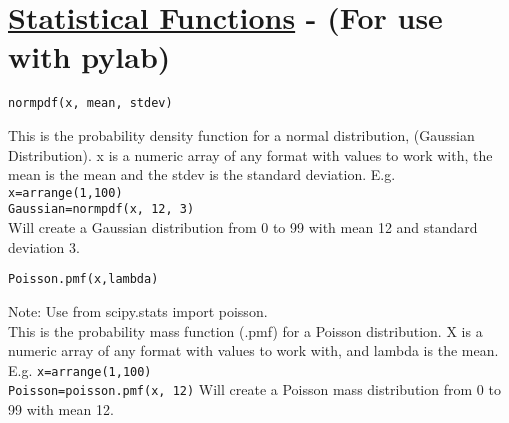 \section*{\underline{Statistical Functions}  - ({\color{red}For use with pylab})}

\noindent \texttt{normpdf(x, mean, stdev)}
\begin{myindentpar}{1.4cm}
\vspace*{-1ex}
This is the probability density function for a normal distribution, (Gaussian Distribution). x is a numeric array of any format with values to work with, the mean is the mean and the stdev is the standard deviation.
E.g. \texttt{x=arrange(1,100)\\
Gaussian=normpdf(x, 12, 3)}\\
Will create a Gaussian distribution from 0 to 99 with mean 12 and standard deviation 3.
\end{myindentpar}


\noindent \texttt{Poisson.pmf(x,lambda)}
\begin{myindentpar}{1.4cm}
\vspace*{-1ex}
{\color{red}Note:} Use {\color{orange}from} scipy.stats {\color{orange}import} poisson.\\
This is the probability mass function (.pmf) for a Poisson distribution. X is a numeric array of any format with values to work with, and lambda is the mean.\\
E.g. \texttt{x=arrange(1,100)\\
Poisson=poisson.pmf(x, 12)}
Will create a Poisson mass distribution from 0 to 99 with mean 12.
\end{myindentpar}

